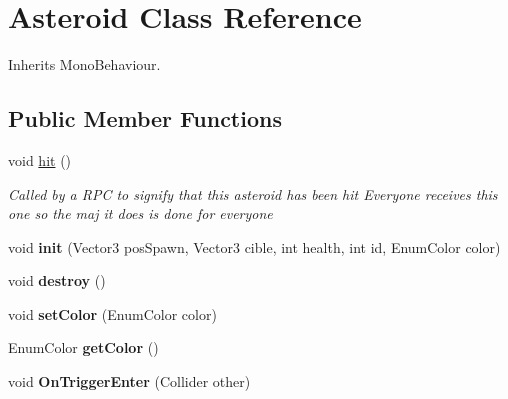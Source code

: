 \hypertarget{class_asteroid}{\section{Asteroid Class Reference}
\label{class_asteroid}
}


Inherits Mono\-Behaviour.

\subsection*{Public Member Functions}
\begin{DoxyCompactItemize}
\item 
void \hyperlink{class_asteroid_aa666b4ffef0c5d2e8446dcf144c2fde2}{hit} ()
\begin{DoxyCompactList}\small\item\em Called by a R\-P\-C to signify that this asteroid has been hit Everyone receives this one so the maj it does is done for everyone \end{DoxyCompactList}\item 
\hypertarget{class_asteroid_a11d4009d97a241383d3c8b4e2f703304}{void {\bfseries init} (Vector3 pos\-Spawn, Vector3 cible, int health, int id, Enum\-Color color)}\label{class_asteroid_a11d4009d97a241383d3c8b4e2f703304}

\item 
\hypertarget{class_asteroid_aa8057ed04927a44c6ec757172e0bcee3}{void {\bfseries destroy} ()}\label{class_asteroid_aa8057ed04927a44c6ec757172e0bcee3}

\item 
\hypertarget{class_asteroid_a92e84a0d8c6431fe8858558571573cc9}{void {\bfseries set\-Color} (Enum\-Color color)}\label{class_asteroid_a92e84a0d8c6431fe8858558571573cc9}

\item 
\hypertarget{class_asteroid_a0c780e5a50fb067022dfd625cf31a41c}{Enum\-Color {\bfseries get\-Color} ()}\label{class_asteroid_a0c780e5a50fb067022dfd625cf31a41c}

\item 
\hypertarget{class_asteroid_af41ba317055576cdab000fbf8356d3bd}{void {\bfseries On\-Trigger\-Enter} (Collider other)}\label{class_asteroid_af41ba317055576cdab000fbf8356d3bd}

\end{DoxyCompactItemize}
